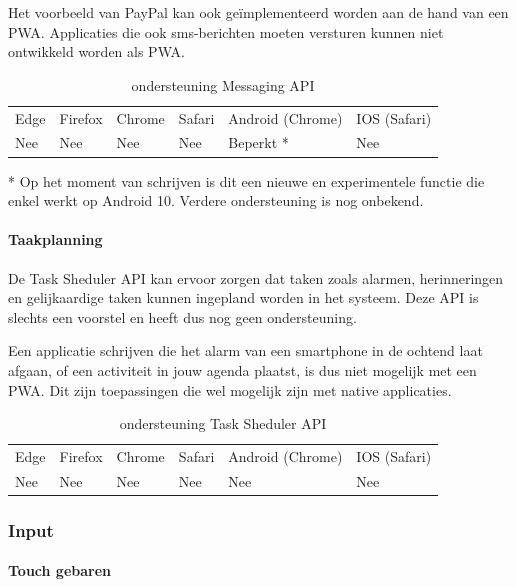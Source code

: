 Het voorbeeld van PayPal kan ook geïmplementeerd worden aan de hand van een PWA. Applicaties die ook sms-berichten moeten versturen kunnen niet ontwikkeld worden als PWA.

\begin{table}[H]
	\centering
	\begin{tabular}{llllll}
		Edge & Firefox & Chrome & Safari & Android (Chrome) & IOS (Safari) \\
		Nee   & Nee      &  Nee     & Nee     & Beperkt *             & Nee          
	\end{tabular}	
	\caption{ondersteuning Messaging API}{* Op het moment van schrijven is dit een nieuwe en experimentele functie die enkel werkt op 
		Android 10. Verdere ondersteuning is nog onbekend.}
\end{table}	



\paragraph{Taakplanning}
De Task Sheduler API \autocite{Kulkarni2020} kan ervoor zorgen dat taken zoals alarmen, herinneringen en gelijkaardige taken kunnen ingepland worden in het systeem. Deze API is slechts een voorstel en heeft dus nog geen ondersteuning.

Een applicatie schrijven die het alarm van een smartphone in de ochtend laat afgaan, of een activiteit in jouw agenda plaatst, is dus niet mogelijk met een PWA. Dit zijn toepassingen die wel mogelijk zijn met native applicaties.

\begin{table}[H]
	\centering
	\begin{tabular}{llllll}
		Edge & Firefox & Chrome & Safari & Android (Chrome) & IOS (Safari) \\
		Nee   & Nee      &  Nee     & Nee     & Nee               & Nee          
	\end{tabular}	
	\caption{ondersteuning Task Sheduler API }
\end{table}	



\subsubsection{Input}

\paragraph{Touch gebaren}

